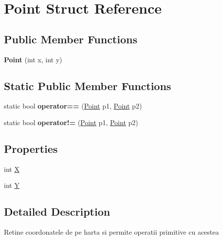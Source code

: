 \hypertarget{struct_point}{}\section{Point Struct Reference}
\label{struct_point}
\subsection*{Public Member Functions}
\begin{DoxyCompactItemize}
\item 
\mbox{\label{struct_point_a936b3f1136112cccf9719fb3b294b2b9}} 
{\bfseries Point} (int x, int y)
\end{DoxyCompactItemize}
\subsection*{Static Public Member Functions}
\begin{DoxyCompactItemize}
\item 
\mbox{\label{struct_point_a9f41928a50d8c3df7701df79f90fab91}} 
static bool {\bfseries operator==} (\hyperlink{struct_point}{Point} p1, \hyperlink{struct_point}{Point} p2)
\item 
\mbox{\label{struct_point_a2d4f94967363875413d1d709afd8f755}} 
static bool {\bfseries operator!=} (\hyperlink{struct_point}{Point} p1, \hyperlink{struct_point}{Point} p2)
\end{DoxyCompactItemize}
\subsection*{Properties}
\begin{DoxyCompactItemize}
\item 
int \hyperlink{struct_point_a944eb35c3d0b0efea5555a82a8c4a6fc}{X}
\item 
int \hyperlink{struct_point_ac41b750e0b7eb2adbe2c808e4521a94b}{Y}
\end{DoxyCompactItemize}


\subsection{Detailed Description}
Retine coordonatele de pe harta si permite operatii primitive cu acestea 

